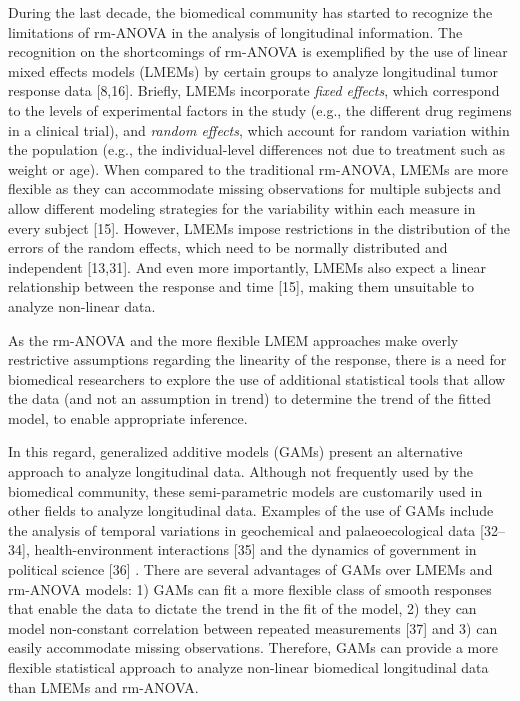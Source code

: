 \documentclass[
]{article}
\begin{document}
During the last decade, the biomedical community has started to recognize the limitations of rm-ANOVA in the analysis of longitudinal information. The recognition on the shortcomings of rm-ANOVA is exemplified by the use of linear mixed effects models (LMEMs) by certain groups to analyze longitudinal tumor response data {[}8,16{]}. Briefly, LMEMs incorporate \emph{fixed effects}, which correspond to the levels of experimental factors in the study (e.g., the different drug regimens in a clinical trial), and \emph{random effects}, which account for random variation within the population (e.g., the individual-level differences not due to treatment such as weight or age). When compared to the traditional rm-ANOVA, LMEMs are more flexible as they can accommodate missing observations for multiple subjects and allow different modeling strategies for the variability within each measure in every subject {[}15{]}. However, LMEMs impose restrictions in the distribution of the errors of the random effects, which need to be normally distributed and independent {[}13,31{]}. And even more importantly, LMEMs also expect a linear relationship between the response and time {[}15{]}, making them unsuitable to analyze non-linear data.

As the rm-ANOVA and the more flexible LMEM approaches make overly restrictive assumptions regarding the linearity of the response, there is a need for biomedical researchers to explore the use of additional statistical tools that allow the data (and not an assumption in trend) to determine the trend of the fitted model, to enable appropriate inference.

In this regard, generalized additive models (GAMs) present an alternative approach to analyze longitudinal data. Although not frequently used by the biomedical community, these semi-parametric models are customarily used in other fields to analyze longitudinal data. Examples of the use of GAMs include the analysis of temporal variations in geochemical and palaeoecological data {[}32--34{]}, health-environment interactions {[}35{]} and the dynamics of government in political science {[}36{]} . There are several advantages of GAMs over LMEMs and rm-ANOVA models: 1) GAMs can fit a more flexible class of smooth responses that enable the data to dictate the trend in the fit of the model, 2) they can model non-constant correlation between repeated measurements {[}37{]} and 3) can easily accommodate missing observations. Therefore, GAMs can provide a more flexible statistical approach to analyze non-linear biomedical longitudinal data than LMEMs and rm-ANOVA.
\end{document}
